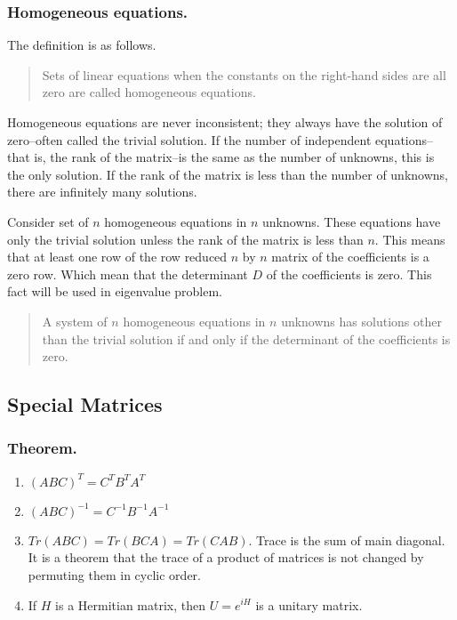 \documentclass[../main.tex]{subfiles}
\begin{document}
\subsubsection*{Homogeneous equations.} The definition is as follows.

\begin{quote}
    Sets of linear equations when the constants on the right-hand sides are all zero are called homogeneous equations.
\end{quote}

Homogeneous equations are never inconsistent; they always have the solution of zero--often called the trivial solution. 
If the number of independent equations--that is, the rank of the matrix--is the same as the number of unknowns, this is the only solution. 
If the rank of the matrix is less than the number of unknowns, there are infinitely many solutions.

Consider set of $n$ homogeneous equations in $n$ unknowns.
These equations have only the trivial solution unless the rank of the matrix is less than $n$. 
This means that at least one row of the row reduced $n$ by $n$ matrix of the coefficients is a zero row. 
Which mean that the determinant $D$ of the coefficients is zero.
This fact will be used in eigenvalue problem.

\begin{quote}
    A system of $n$ homogeneous equations in $n$ unknowns has solutions other than the trivial solution if and only if the determinant of the coefficients is zero.
\end{quote}


\subsection*{Special Matrices}
\subsubsection*{Theorem.}
\begin{enumerate}
    \item $(ABC)^T=C^TB^TA^T$
    \item $(ABC)^{-1}=C^{-1}B^{-1}A^{-1}$
    \item $Tr(ABC)=Tr(BCA)=Tr(CAB)$.  Trace is the sum of main diagonal. It is a theorem that the
    trace of a product of matrices is not changed by permuting them in cyclic order.
    \item If $H$ is a Hermitian matrix, then $U = e^{iH}$ is a unitary matrix.
\end{enumerate}
\end{document}
